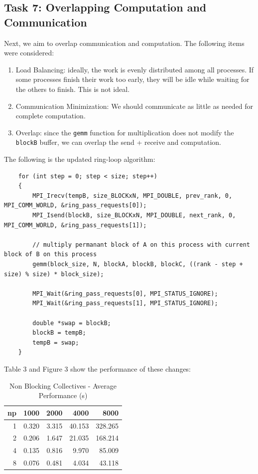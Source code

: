 \documentclass{article}
\begin{document}
\subsection*{Task 7: Overlapping Computation and Communication}
Next, we aim to overlap communication and computation. The following items were considered:
\begin{enumerate}
    \item Load Balancing: ideally, the work is evenly distributed among all 
    processes. If some processes finish their work too early, they will be idle while 
    waiting for the others to finish. This is not ideal.
    \item Communication Minimization: We should communicate as little as needed for complete computation.
    \item Overlap: since the \texttt{gemm} function for multiplication does not modify the \texttt{blockB} buffer, 
    we can overlap the send + receive and computation.
\end{enumerate}
The following is the updated ring-loop algorithm:
\begin{lstlisting}
    for (int step = 0; step < size; step++)
    {
        MPI_Irecv(tempB, size_BLOCKxN, MPI_DOUBLE, prev_rank, 0, MPI_COMM_WORLD, &ring_pass_requests[0]);
        MPI_Isend(blockB, size_BLOCKxN, MPI_DOUBLE, next_rank, 0, MPI_COMM_WORLD, &ring_pass_requests[1]);

        // multiply permanant block of A on this process with current block of B on this process
        gemm(block_size, N, blockA, blockB, blockC, ((rank - step + size) % size) * block_size);

        MPI_Wait(&ring_pass_requests[0], MPI_STATUS_IGNORE);
        MPI_Wait(&ring_pass_requests[1], MPI_STATUS_IGNORE);

        double *swap = blockB;
        blockB = tempB;
        tempB = swap;
    }
\end{lstlisting}
Table 3 and Figure 3 show the performance of these changes:
\begin{table}[H]
    \centering
    \caption{Non Blocking Collectives - Average Performance (s)}
    \fontsize{12}{14}\selectfont
    \begin{tabular}[t]{rrrrr}
    \toprule
    np & 1000 & 2000 & 4000 & 8000\\
    \midrule
    1 & 0.320 & 3.315 & 40.153 & 328.265\\
    2 & 0.206 & 1.647 & 21.035 & 168.214\\
    4 & 0.135 & 0.816 & 9.970 & 85.009\\
    8 & 0.076 & 0.481 & 4.034 & 43.118\\
    \bottomrule
    \end{tabular}
\end{table}
\end{document}

